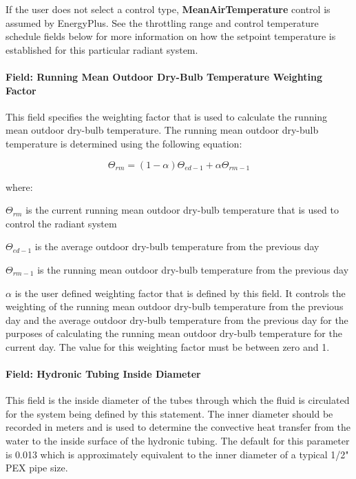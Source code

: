 If the user does not select a control type, \textbf{MeanAirTemperature} control is assumed by EnergyPlus. See the throttling range and control temperature schedule fields below for more information on how the setpoint temperature is established for this particular radiant system.

\paragraph{Field: Running Mean Outdoor Dry-Bulb Temperature Weighting Factor}\label{field-running-mean-outdoor-dry-bulb-temperature-weighting-factor}

This field specifies the weighting factor that is used to calculate the running mean outdoor dry-bulb temperature.  The running mean outdoor dry-bulb temperature is determined using the following equation:

\begin{equation}
\Theta_{rm} = (1 - \alpha) \Theta_{ed-1} + \alpha \Theta_{rm-1}
\label{eq:RunningMeanOutdoorDryBulbTemperatureEquation}
\end{equation}

where:

\(\Theta_{rm}\) is the current running mean outdoor dry-bulb temperature that is used to control the radiant system

\(\Theta_{ed-1}\) is the average outdoor dry-bulb temperature from the previous day

\(\Theta_{rm-1}\) is the running mean outdoor dry-bulb temperature from the previous day

\(\alpha\) is the user defined weighting factor that is defined by this field.  It controls the weighting of the running mean outdoor dry-bulb temperature from the previous day and the average outdoor dry-bulb temperature from the previous day for the purposes of calculating the running mean outdoor dry-bulb temperature for the current day.  The value for this weighting factor must be between zero and 1.

\paragraph{Field: Hydronic Tubing Inside Diameter}\label{field-hydronic-tubing-inside-diameter-001}

This field is the inside diameter of the tubes through which the fluid is circulated for the system being defined by this statement. The inner diameter should be recorded in meters and is used to determine the convective heat transfer from the water to the inside surface of the hydronic tubing.  The default for this parameter is 0.013 which is approximately equivalent to the inner diameter of a typical 1/2" PEX pipe size.

